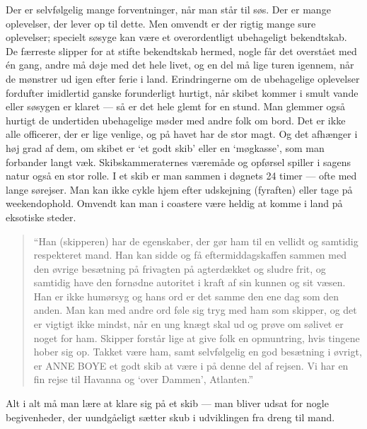 Der er selvfølgelig mange forventninger, når man står til søs. Der er
mange oplevelser, der lever op til dette. Men omvendt er der rigtig mange
sure oplevelser; specielt søsyge kan være et overordentligt ubehageligt
bekendtskab. De færreste slipper for at stifte bekendtskab hermed, nogle
får det overstået med én gang, andre må døje med det hele livet, og en del
må lige turen igennem, når de mønstrer ud igen efter ferie i land.
Erindringerne om de ubehagelige oplevelser fordufter imidlertid ganske
forunderligt hurtigt, når skibet kommer i smult vande eller søsygen er
klaret --- så er det hele glemt for en stund. Man glemmer også hurtigt de
undertiden ubehagelige møder med andre folk om bord. Det er ikke alle
officerer, der er lige venlige, og på havet har de stor magt. Og det
afhænger i høj grad af dem, om skibet er `et godt skib' eller en
`møgkasse', som man forbander langt væk.  Skibskammeraternes væremåde og
opførsel spiller i sagens natur også en stor rolle. I et skib er man
sammen i døgnets 24 timer --- ofte med lange sørejser. Man kan ikke cykle
hjem efter udskejning (fyraften) eller tage på weekendophold. Omvendt kan
man i coastere være heldig at komme i land på eksotiske steder. 

\begin{quote}
    ``Han (skipperen) har de egenskaber, der gør ham
    til en vellidt og samtidig respekteret mand. Han kan sidde og få
    eftermiddagskaffen sammen med den øvrige besætning på frivagten på
    agterdækket og sludre frit, og samtidig have den fornødne autoritet i
    kraft af sin kunnen og sit væsen. Han er ikke humørsyg og hans ord er
    det samme den ene dag som den anden. Man kan med andre ord føle sig tryg
    med ham som skipper, og det er vigtigt ikke mindst, når en ung knægt
    skal ud og prøve om sølivet er noget for ham. Skipper forstår lige at
    give folk en opmuntring, hvis tingene hober sig op. Takket være ham,
    samt selvfølgelig en god besætning i øvrigt, er ANNE BOYE et godt skib
    at være i på denne del af rejsen. Vi har en fin rejse til Havanna og
    `over Dammen', Atlanten.''
\end{quote}


Alt i alt må man lære at klare sig på et skib --- man bliver udsat for
nogle begivenheder, der uundgåeligt sætter skub i udviklingen fra dreng
til mand.
